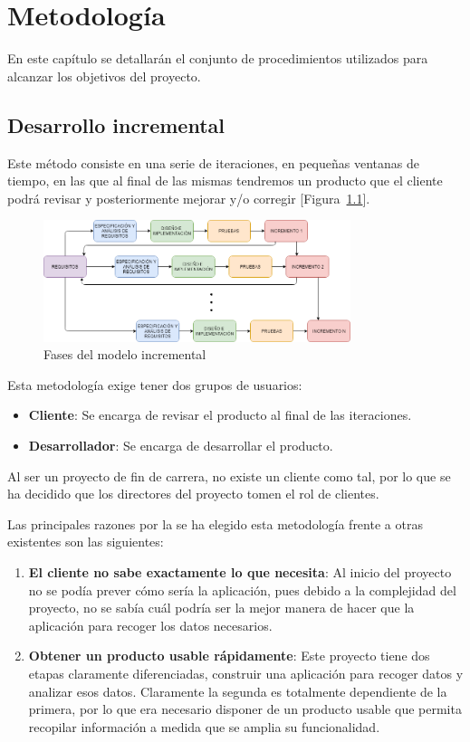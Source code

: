 \chapter{Metodología}
\label{chap:metodologia}

En este capítulo se detallarán el conjunto de procedimientos utilizados para alcanzar los objetivos del proyecto.


\section{Desarrollo  incremental}
Este método consiste en una serie de iteraciones, en pequeñas ventanas de tiempo, en las que al final de las mismas tendremos un producto que el cliente podrá revisar y posteriormente mejorar y/o corregir [Figura~\ref{fig:metodologia}]. 

\begin{figure}[h]
    \centering
    \includegraphics[width=0.8\textwidth, keepaspectratio]{imaxes/Metodologia.png}
    \caption{Fases del modelo incremental}
    \label{fig:metodologia}
\end{figure}

Esta metodología exige tener dos grupos de usuarios:
\begin{itemize}
    \item \textbf{Cliente}: Se encarga de revisar el producto al final de las iteraciones.
    \item \textbf{Desarrollador}: Se encarga de desarrollar el producto.
\end{itemize}

Al ser un proyecto de fin de carrera, no existe un cliente como tal, por lo que se ha decidido que los directores del proyecto tomen el rol de clientes.

Las principales razones por la se ha elegido esta metodología frente a otras existentes son las siguientes:
\begin{enumerate}
    \item \textbf{El cliente no sabe exactamente lo que necesita}: Al inicio del proyecto no se podía prever cómo sería la aplicación, pues debido a la complejidad del proyecto, no se sabía cuál podría ser la mejor manera de hacer que la aplicación para recoger los datos necesarios. 
    
    \item \textbf{Obtener un producto usable rápidamente}: Este proyecto tiene dos etapas claramente diferenciadas, construir una aplicación para recoger datos y analizar esos datos. Claramente la segunda es totalmente dependiente de la primera, por lo que era necesario disponer de un producto usable que permita recopilar información a medida que se amplia su funcionalidad.
    
\end{enumerate}

